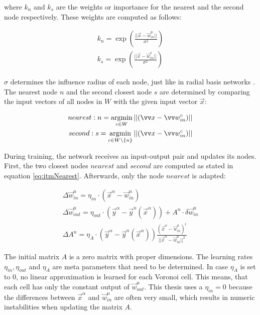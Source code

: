 where $k_n$ and $k_s$ are the weights or importance for the nearest and the second node respectively. These weights are computed as follows:

\begin{equation}
\begin{split}
k_n = \exp\left(\frac{||\vec{x}-\vec{w}^n_{in}||}{\sigma^2}\right) \\
k_s = \exp\left(\frac{||\vec{x}-\vec{w}^s_{in}||}{\sigma^2}\right) 
\end{split}
\end{equation}

$\sigma$ determines the influence radius of each node, just like in radial basis networks \cite{rbf}.
The nearest node $n$ and the second closest node $s$ are determined by comparing the input vectors of all nodes in $W$ with the given input vector $\vec{x}$:

\begin{equation}
\begin{split}
	nearest: n = \argmin_{c\in W} ||(\vec{x} - \vec{w}^c_{in})|| \\
	second: s = \argmin_{c\in W\backslash\{n\}} ||(\vec{x} - \vec{w}^c_{in})||
\end{split}
\label{eq:itmNearest}
\end{equation}

During training, the network receives an input-output pair and updates its nodes. First, the two closest nodes $nearest$ and $second$ are computed as stated in equation \ref{eq:itmNearest}. Afterwards, only the node $nearest$ is adapted:

\begin{equation}
\begin{split}
\Delta \vec{w}^n_{in} = \eta_{in} \cdot (\vec{x}^\alpha - \vec{w}^n_{in}) \\
\Delta \vec{w}^n_{out} = \eta_{out} \cdot (\vec{y}^\alpha - \vec{y}^n(\vec{x}^\alpha)) + A^n \cdot \delta \vec{w}^n_{in} \\
\Delta A^n = \eta_A \cdot (\vec{y}^\alpha - \vec{y}^n(\vec{x}^\alpha)) \frac{(\vec{x}^\alpha - \vec{w}^n_{in})^t}{||\vec{x}^\alpha - \vec{w}^n_{in}||^2}
\end{split}
\end{equation}

The initial matrix $A$ is a zero matrix with proper dimensions. The learning rates $\eta_{in}, \eta_{out}$ and $\eta_A$ are meta parameters that need to be determined. In case $\eta_A$ is set to 0, no linear approximation is learned for each Voronoi cell. This means, that each cell has only the constant output of $\vec{w}^n_{out}$. This thesis uses a $\eta_{in} = 0$ because the differences between $\vec{x}^\alpha$ and  $\vec{w}^n_{in}$ are often very small, which results in numeric instabilities when updating the matrix $A$.

